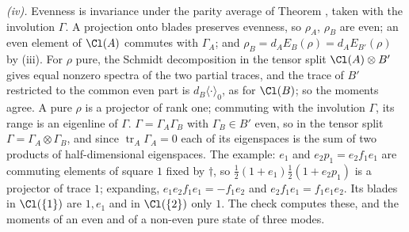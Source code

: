 \emph{(iv).} Evenness is invariance under the parity average of Theorem , taken with the involution $\Gamma$. A projection onto blades preserves evenness, so $\rho_{A}$, $\rho_{B}$ are even; an even element of $\Cl(A)$ commutes with $\Gamma_{A}$; and $\rho_{B} = d_{A}E_{B}(\rho) = d_{A}E_{B'}(\rho)$ by (iii). For $\rho$ pure, the Schmidt decomposition in the tensor split $\Cl(A) \otimes B'$ gives equal nonzero spectra of the two partial traces, and the trace of $B'$ restricted to the common even part is $d_{B}\langle\cdot\rangle_{0}$, as for $\Cl(B)$; so the moments agree. A pure $\rho$ is a projector of rank one; commuting with the involution $\Gamma$, its range is an eigenline of $\Gamma$. $\Gamma = \Gamma_{A}\Gamma_{B}$ with $\Gamma_{B} \in B'$ even, so in the tensor split $\Gamma = \Gamma_{A} \otimes \Gamma_{B}$, and since $\operatorname{tr}_{A}\Gamma_{A} = 0$ each of its eigenspaces is the sum of two products of half-dimensional eigenspaces. The example: $e_{1}$ and $e_{2}p_{1} = e_{2}f_{1}e_{1}$ are commuting elements of square $1$ fixed by $\dagger$, so $\tfrac12(1 + e_{1})\tfrac12(1 + e_{2}p_{1})$ is a projector of trace $1$; expanding, $e_{1}e_{2}f_{1}e_{1} = -f_{1}e_{2}$ and $e_{2}f_{1}e_{1} = f_{1}e_{1}e_{2}$. Its blades in $\Cl(\{1\})$ are $1, e_{1}$ and in $\Cl(\{2\})$ only $1$. The check computes these, and the moments of an even and of a non-even pure state of three modes.

